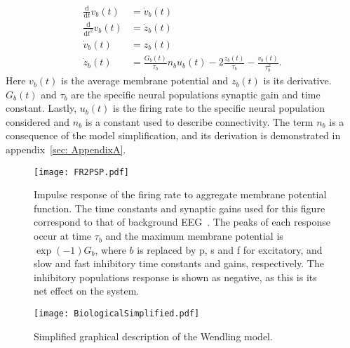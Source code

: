 \begin{align}
\label{eqn: dummy1}
\frac{\mathrm{d}}{\mathrm{d}t}v_{b}(t) &= \dot{v}_{b}(t)\\
\label{eqn: dummy2}
\frac{\mathrm{d}}{\mathrm{d}t^2}v_{b}(t) &= \dot{z}_{b}(t)\\
\label{eqn: FR2PSP1}
\dot{v}_{b}(t)&= z_{b}(t)\\
\label{eqn: FR2PSP2}
\dot{z}_{b}(t)&=\frac{G_{b}(t)}{\tau_{b}}n_{b}u_{b}(t)-2\frac{z_{b}(t)}{\tau_{b}}-\frac{v_{b}(t)}{\tau_{b}^{2}}.
\end{align} Here $v_{b}(t)$ is the average membrane potential and $z_{b}(t)$ is its derivative. $G_{b}(t)$ and $\tau_{b}$ are the specific neural populations synaptic gain and time constant. Lastly, $u_{b}(t)$ is the firing rate to the specific neural population considered and $n_{b}$ is a constant used to describe connectivity. The term $n_{b}$ is a consequence of the model simplification, and its derivation is demonstrated in appendix~\ref{sec: AppendixA}.

\begin{figure}%
	\centering
		\texttt{[image: FR2PSP.pdf]}
	\caption{Impulse response of the firing rate to aggregate membrane potential function. The time constants and synaptic gains used for this figure correspond to that of background EEG~\citep{wendling2002epileptic}. The peaks of each response occur at time $\tau_{b}$ and the maximum membrane potential is $\exp(-1)G_{b}$, where $b$ is replaced by p, s and f for excitatory, and slow and fast inhibitory time constants and gains, respectively. The inhibitory populations response is shown as negative, as this is its net effect on the system.}
	\label{fig: FR2PSP_final}
\end{figure} %
\begin{figure}
\centering
\texttt{[image: BiologicalSimplified.pdf]}
\caption{Simplified graphical description of the Wendling model.}
\label{fig: BiologicalSimplified}
\end{figure}


